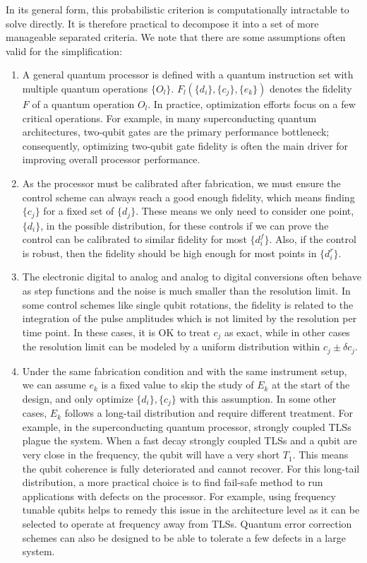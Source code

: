 \documentclass[a4paper,onecolumn,11pt,unpublished]{quantumarticle}
\newcommand{\setelem}[1]{\ensuremath{\{#1\}}}
\newcommand{\setelemtwo}[2]{\setelem{#1},\setelem{#2}}
\begin{document}
In its general form, this probabilistic criterion is computationally intractable to solve directly. It is therefore practical to decompose it into a set of more manageable separated criteria. We note that there are some assumptions often valid for the simplification:
\begin{enumerate}
  \item A general quantum processor is defined with a quantum instruction set with multiple quantum operations $\setelem{O_l}$. $F_l(\setelem{d_i},\setelem{c_j},\setelem{e_k})$ denotes the fidelity $F$ of a quantum operation $O_l$. In practice, optimization efforts focus on a few critical operations. For example, in many superconducting quantum architectures, two-qubit gates are the primary performance bottleneck; consequently, optimizing two-qubit gate fidelity is often the main driver for improving overall processor performance.
  \item As the processor must be calibrated after fabrication, we must ensure the control scheme can always reach a good enough fidelity, which means finding $\setelem{c_j}$ for a fixed set of $\setelem{d_j}$. These means we only need to consider one point, $\setelem{d_i}$, in the possible distribution, for these controls if we can prove the control can be calibrated to similar fidelity for most $\setelem{d^f_i}$. Also, if the control is robust, then the fidelity should be high enough for most points in $\setelem{d^r_i}$.
  \item The electronic digital to analog and analog to digital conversions often behave as step functions and the noise is much smaller than the resolution limit. In some control schemes like single qubit rotations, the fidelity is related to the integration of the pulse amplitudes which is not limited by the resolution per time point. In these cases, it is OK to treat $c_j$ as exact, while in other cases the resolution limit can be modeled by a uniform distribution within $c_j\pm\delta c_j$.
  \item Under the same fabrication condition and with the same instrument setup, we can assume $e_k$ is a fixed value to skip the study of $E_k$ at the start of the design, and only optimize $\setelemtwo{d_i}{c_j}$ with this assumption. In some other cases, $E_k$ follows a long-tail distribution and require different treatment. For example, in the superconducting quantum processor, strongly coupled TLSs plague the system. When a fast decay strongly coupled TLSs and a qubit are very close in the frequency, the qubit will have a very short $T_1$. This means the qubit coherence is fully deteriorated and cannot recover. For this long-tail distribution, a more practical choice is to find fail-safe method to run applications with defects on the processor. For example, using frequency tunable qubits helps to remedy this issue in the architecture level as it can be selected to operate at frequency away from TLSs. Quantum error correction schemes can also be designed to be able to tolerate a few defects in a large system.
\end{enumerate}
\end{document}
